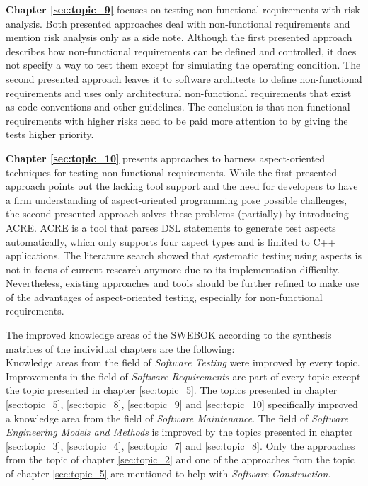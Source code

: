 \textbf{Chapter \ref{sec:topic_9}} focuses on testing non-functional requirements with risk analysis. Both presented approaches deal with non-functional requirements and mention risk analysis only as a side note. Although the first presented approach \cite{ZouPavlovski2008} describes how non-functional requirements can be defined and controlled, it does not specify a way to test them except for simulating the operating condition. The second presented approach \cite{Lagerstedt2014} leaves it to software architects to define non-functional requirements and uses only architectural non-functional requirements that exist as code conventions and other guidelines. The conclusion is that non-functional requirements with higher risks need to be paid more attention to by giving the tests higher priority.

\textbf{Chapter \ref{sec:topic_10}} presents approaches to harness aspect-oriented techniques for testing non-functional requirements. While the first presented approach \cite{Metsa} points out the lacking tool support and the need for developers to have a firm understanding of aspect-oriented programming pose possible challenges, the second presented approach \cite{Duclos} solves these problems (partially) by introducing ACRE. ACRE is a tool that parses DSL statements to generate test aspects automatically, which only supports four aspect types and is limited to C++ applications. The literature search showed that systematic testing using aspects is not in focus of current research anymore due to its implementation difficulty. Nevertheless, existing approaches and tools should be further refined to make use of the advantages of aspect-oriented testing, especially for non-functional requirements. 

The improved knowledge areas of the SWEBOK according to the synthesis matrices of the individual chapters are the following:\\
Knowledge areas from the field of \textit{Software Testing} were improved by every topic. Improvements in the field of \textit{Software Requirements} are part of every topic except the topic presented in chapter \ref{sec:topic_5}. The topics presented in chapter \ref{sec:topic_5}, \ref{sec:topic_8}, \ref{sec:topic_9} and \ref{sec:topic_10} specifically improved a knowledge area from the field of \textit{Software Maintenance}. The field of \textit{Software Engineering Models and Methods} is improved by the topics presented in chapter \ref{sec:topic_3}, \ref{sec:topic_4}, \ref{sec:topic_7} and \ref{sec:topic_8}. Only the approaches from the topic of chapter \ref{sec:topic_2} and one of the approaches from the topic of chapter \ref{sec:topic_5} are mentioned to help with \textit{Software Construction}.

